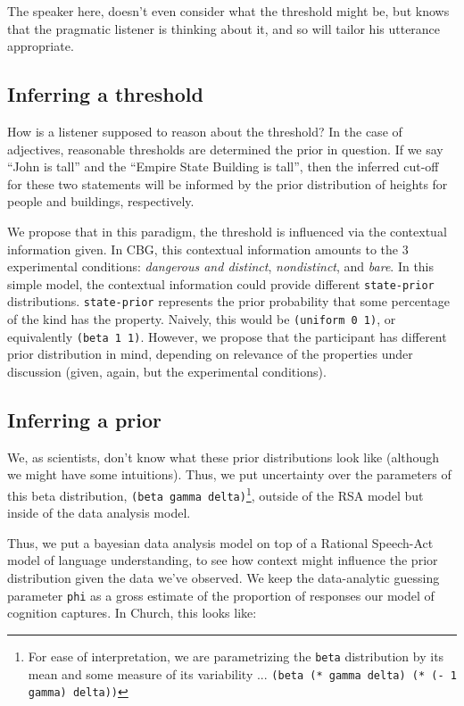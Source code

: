 \documentclass[10pt,letterpaper]{article}
\begin{document}
The speaker here, doesn't even consider what the threshold might be, but knows that the pragmatic listener is thinking about it, and so will tailor his utterance appropriate.

\subsection{Inferring a threshold}

How is a listener supposed to reason about the threshold? In the case of adjectives, reasonable thresholds are determined the prior in question. If we say ``John is tall'' and the ``Empire State Building is tall'', then the inferred cut-off for these two statements will be informed by the prior distribution of heights for people and buildings, respectively. 

We propose that in this paradigm, the threshold is influenced via the contextual information given. In CBG, this contextual information amounts to the 3 experimental conditions: \emph{dangerous and distinct}, \emph{nondistinct}, and \emph{bare}. In this simple model, the contextual information could provide different \lstinline{state-prior} distributions. \lstinline{state-prior} represents the  prior probability that some percentage of the kind has the property. Naively, this would be \lstinline{(uniform 0 1)}, or equivalently \lstinline{(beta 1 1)}. However, we propose that the participant has different prior distribution in mind, depending on relevance of the properties under discussion (given, again, but the experimental conditions).

\subsection{Inferring a prior}
We, as scientists, don't know what these prior distributions look like (although we might have some intuitions). Thus, we put uncertainty over the parameters of this beta distribution, \lstinline{(beta gamma delta)}\footnote{For ease of interpretation, we are parametrizing the \lstinline{beta} distribution by its mean and some measure of its variability ... \lstinline{(beta (* gamma delta) (* (- 1 gamma) delta))}}, outside of the RSA model but inside of the data analysis model. 

Thus, we put a bayesian data analysis model on top of a Rational Speech-Act model of language understanding, to see how context might influence the prior distribution given the data we've observed. We keep the data-analytic guessing parameter \lstinline{phi} as a gross estimate of the proportion of responses our model of cognition captures. In Church, this looks like:
\end{document}
